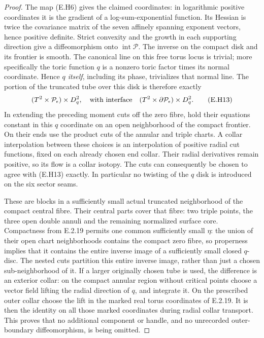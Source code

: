 \begin{proof}
The map (E.H6) gives the claimed coordinates: in logarithmic
positive coordinates it is the gradient of a log-sum-exponential
function.  Its Hessian is twice the covariance matrix of the
seven affinely spanning exponent vectors, hence positive
definite.  Strict convexity and the growth in each supporting
direction give a diffeomorphism onto
$\operatorname{int}\mathcal P$.  The inverse on the compact
disk and its frontier is smooth.  The canonical line on this
free torus locus is trivial; more specifically the toric
function $q$ is a nonzero toric factor times its normal
coordinate.  Hence \emph{$q$ itself}, including its phase,
trivializes that normal line.  The portion of the truncated
tube over this disk is therefore exactly
\[
 (T^2\times\mathcal P_\epsilon)\times D^2_q,
 \quad\hbox{with interface}\quad
 (T^2\times\partial\mathcal P_\epsilon)\times D^2_q.
 \tag{E.H13}
\]
In extending the preceding moment cuts off the zero fibre,
hold their equations constant in this $q$ coordinate on an
open neighborhood of the compact frontier.  On their ends
use the product cuts of the annular and triple charts.  A
collar interpolation between these choices is an interpolation
of positive radial cut functions, fixed on each already chosen
end collar.  Their radial derivatives remain positive, so its
flow is a collar isotopy.  The cuts can consequently be chosen
to agree with (E.H13) exactly.  In particular no twisting of
the $q$ disk is introduced on the six sector seams.

These are blocks in a sufficiently small actual truncated
neighborhood of the compact central fibre.  Their central
parts cover that fibre: two triple points, the three open
double annuli and the remaining normalized surface core.
Compactness from E.2.19 permits one common sufficiently small
$\eta$: the union of their open chart neighborhoods contains
the compact zero fibre, so properness implies that it contains
the entire inverse image of a sufficiently small closed
$q$-disc.  The nested cuts partition this entire inverse
image, rather than just a chosen sub-neighborhood of it.
If a larger originally chosen tube is used, the
difference is an exterior collar: on the compact annular
region without critical points choose a vector field lifting
the radial direction of $q$, and integrate it.  On the
prescribed outer collar choose the lift in the marked real
torus coordinates of E.2.19.  It is then the identity on all
those marked coordinates during radial collar transport.
This proves that no additional component or handle, and no
unrecorded outer-boundary diffeomorphism, is being omitted.


\end{proof}
